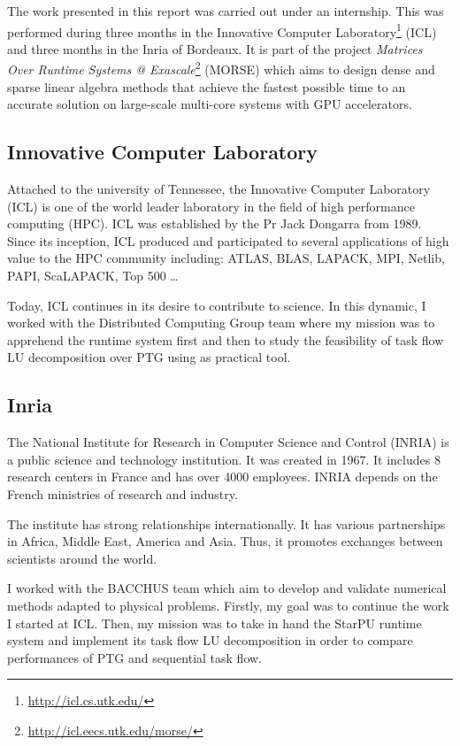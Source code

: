 The work presented in this report was carried out under an internship. This was performed during three months in the Innovative Computer Laboratory\footnote{\url{http://icl.cs.utk.edu/}} (ICL) and three months in the Inria of Bordeaux. It is part of the project \emph{Matrices Over Runtime Systems @ Exascale}\footnote{\url{http://icl.eecs.utk.edu/morse/}} (MORSE) which aims to design dense and sparse linear algebra methods that achieve the fastest possible time to an accurate solution on large-scale multi-core systems with GPU accelerators.

\subsection*{Innovative Computer Laboratory}
Attached to the university of Tennessee, the Innovative Computer Laboratory (ICL) is one of the world leader laboratory in the field of high performance computing (HPC). ICL was established by the Pr Jack Dongarra from 1989. Since its inception, ICL produced and participated to several applications of high value to the HPC community including: ATLAS, BLAS, LAPACK, MPI, Netlib, PAPI, ScaLAPACK, Top 500 \dots

Today, ICL continues in its desire to contribute to science. In this dynamic, I worked with the Distributed Computing Group team where my mission was to apprehend the \dague runtime system first and then to study the feasibility of task flow LU decomposition over PTG using \dague as practical tool.

\subsection*{Inria}
The National Institute for Research in Computer Science and Control (INRIA) is a public science and technology institution. It was created in 1967. It includes 8 research centers in France and has over 4000 employees. INRIA depends on the French ministries of research and industry.

The institute has strong relationships internationally. It has various partnerships in Africa, Middle East, America and Asia. Thus, it promotes exchanges between scientists around the world.

I worked with the BACCHUS team which aim to develop and validate numerical methods adapted to physical problems. Firstly, my goal was to continue the work I started at ICL. Then, my mission was to take in hand the StarPU runtime system and implement its task flow LU decomposition in order to compare performances of PTG and sequential task flow.